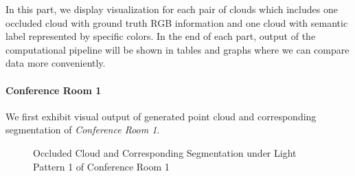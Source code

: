 \documentclass[11pt, a4paper,oneside,chapterprefix=false]{scrbook}
\begin{document}
In this part, we display visualization for each pair of clouds which includes one occluded cloud with ground truth RGB information and one cloud with semantic label represented by specific colors. In the end of each part, output of the computational pipeline will be shown in tables and graphs where we can compare data more conveniently.

\paragraph{Conference Room 1}

We first exhibit visual output of generated point cloud and corresponding segmentation of \emph{Conference Room 1}.

\begin{figure}[H]
    \centering
      \label{fig:conf1 0 occluded} \hfill
     \label{fig:conf1 0 seg}
    \caption{Occluded Cloud and Corresponding Segmentation under Light Pattern 1 of Conference Room 1}
    \label{fig:conf1 0 occ and seg}
\end{figure}
\end{document}
